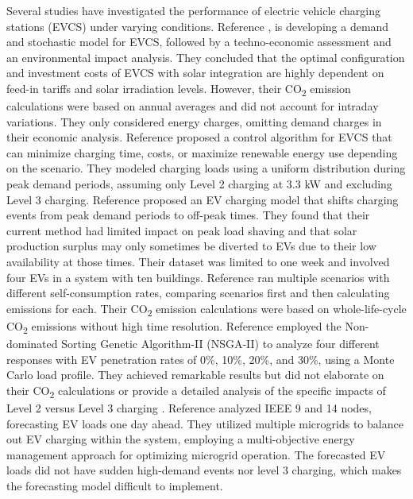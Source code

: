 \documentclass[conference]{IEEEtran}
\begin{document}
  		Several studies have investigated the performance of electric vehicle charging stations (EVCS) under varying conditions. Reference \cite{himabindu2021analysis}, is developing a demand and stochastic model for EVCS, followed by a techno-economic assessment and an environmental impact analysis. They concluded that the optimal configuration and investment costs of EVCS with solar integration are highly dependent on feed-in tariffs and solar irradiation levels. However, their CO\textsubscript{2} emission calculations were based on annual averages and did not account for intraday variations. They only considered energy charges, omitting demand charges in their economic analysis. Reference \cite{yoon2017economic} proposed a control algorithm for EVCS that can minimize charging time, costs, or maximize renewable energy use depending on the scenario. They modeled charging loads using a uniform distribution during peak demand periods, assuming only Level 2 charging at 3.3 kW and excluding Level 3 charging.  Reference \cite{purvins2018electric} proposed an EV charging model that shifts charging events from peak demand periods to off-peak times. They found that their current method had limited impact on peak load shaving and that solar production surplus may only sometimes be diverted to EVs due to their low availability at those times. Their dataset was limited to one week and involved four EVs in a system with ten buildings. Reference \cite{Khemir} ran multiple scenarios with different self-consumption rates, comparing scenarios first and then calculating emissions for each. Their CO\textsubscript{2} emission calculations were based on whole-life-cycle CO\textsubscript{2} emissions without high time resolution. Reference \cite{huang2023multi} employed the Non-dominated Sorting Genetic Algorithm-II (NSGA-II) to analyze four different responses with EV penetration rates of 0\%, 10\%, 20\%, and 30\%, using a Monte Carlo load profile. They achieved remarkable results but did not elaborate on their CO\textsubscript{2} calculations or provide a detailed analysis of the specific impacts of Level 2 versus Level 3 charging . Reference \cite{tan2020multi} analyzed IEEE 9 and 14 nodes, forecasting EV loads one day ahead. They utilized multiple microgrids to balance out EV charging within the system, employing a multi-objective energy management approach for optimizing microgrid operation. The forecasted EV loads did not have sudden high-demand events nor level 3 charging, which makes the forecasting model difficult to implement. 
\end{document}
